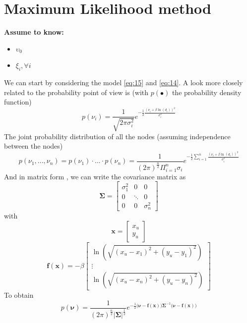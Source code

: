 \documentclass[12pt,twoside]{report}
\begin{document}
\section{Maximum Likelihood method}
  \begin{center}
  \textbf{Assume to know:}
  \begin{itemize}
    \centering
    \item $\upsilon_0$
    \item $\xi_i,\forall i$
  \end{itemize}
  \end{center}
We can start by considering the model \ref{eq:15} and \ref{eq:14}.
A look more closely related to the probability point of view is (with $p(\bullet)$ the probability density function)
\begin{equation}
    p(\nu_i)=\frac{1}{\sqrt{2\pi\sigma^2_i}}e^{-\frac{1}{2}\frac{(\nu_i+\beta\ln(d_i))^2}{\sigma^2_i}}
\end{equation}
The joint probability distribution of all the nodes (assuming independence between the nodes) \begin{equation}
    p(\nu_1,...,\nu_n)=p(\nu_1)\cdot...\cdot p(\nu_n)=\frac{1}{(2\pi)^{\frac{n}{2}}\Pi_{i=1}^n\sigma_i}e^{-\frac{1}{2}\sum_{i=1}^n\frac{(\nu_i+\beta\ln(d_i))^2}{\sigma^2_i}}
\end{equation}
And in matrix form \cite{rzk}, we can write the covariance matrix as 
\begin{equation}
    \boldsymbol{\Sigma}=\begin{bmatrix}
    \sigma^2_1 & 0 & 0\\
    0 &\ddots& 0\\
    0&0&\sigma^2_n
    \end{bmatrix}
\end{equation}
with
\begin{equation}
    \mathbf{x}=\begin{bmatrix}
    x_u\\
    y_u
    \end{bmatrix}
\end{equation}
\begin{equation}
    \mathbf{f}(\mathbf{x})=-\beta\begin{bmatrix}
\ln(\sqrt{(x_u-x_1)^2+(y_u-y_1)^2})\\
\vdots\\
\ln(\sqrt{(x_u-x_n)^2+(y_u-y_n)^2})
\end{bmatrix}
\end{equation}
To obtain
\begin{equation}
    p(\boldsymbol{\nu})=\frac{1}{(2\pi)^{\frac{n}{2}}|\boldsymbol{\Sigma}|^{\frac{1}{2}}}e^{-\frac{1}{2}\big(\boldsymbol{\nu}-\mathbf{f}(\mathbf{x})\big)\boldsymbol{\Sigma}^{-1}\big(\boldsymbol{\nu}-\mathbf{f}(\mathbf{x})\big)}
    \label{eq:16}
\end{equation}
\end{document}
